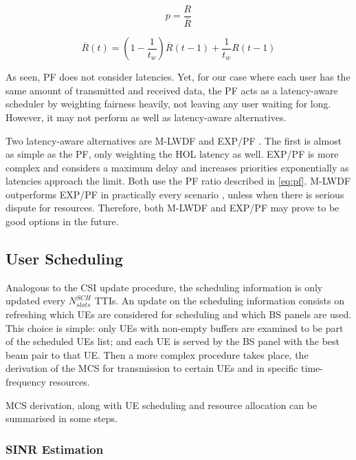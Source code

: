\begin{equation} \label{eq:pf}
    p = \frac{R}{\overline{R}}
\end{equation}

\begin{equation} \label{eq:pf2}
    \overline{R}(t) = \left( 1 - \frac{1}{t_w} \right) \overline{R} (t-1) + \frac{1}{t_w} R(t-1)
\end{equation}

As seen, PF does not consider latencies. Yet, for our case where each user has the same amount of transmitted and received data, the PF acts as a latency-aware scheduler by weighting fairness heavily, not leaving any user waiting for long. However, it may not perform as well as latency-aware alternatives.

Two latency-aware alternatives are \ac{M-LWDF} \cite{scheduler_performance_eval} and \ac{EXP/PF} \cite{exp_algorithm}. 
The first is almost as simple as the PF, only weighting the \ac{HOL} latency as well. \ac{EXP/PF} is more complex and considers a maximum delay and increases priorities exponentially as latencies approach the limit. Both use the PF ratio described in \eqref{eq:pf}. 
\ac{M-LWDF} outperforms \ac{EXP/PF} in practically every scenario \cite{scheduler_performance_eval}, unless when there is serious dispute for resources. Therefore, both \ac{M-LWDF} and \ac{EXP/PF} may prove to be good options in the future.
\subsection{User Scheduling}

Analogous to the CSI update procedure, the scheduling information is only updated every $N^{SCH}_{slots}$ TTIs. An update on the scheduling information consists on refreshing which UEs are considered for scheduling and which BS panels are used. This choice is simple: only UEs with non-empty buffers are examined to be part of the scheduled UEs list; and each UE is served by the BS panel with the best beam pair to that UE. Then a more complex procedure takes place, the derivation of the MCS for transmission to certain UEs and in specific time-frequency resources.

MCS derivation, along with UE scheduling and resource allocation can be summarised in some steps.

\subsubsection*{SINR Estimation}


